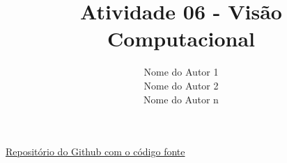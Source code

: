 \documentclass[rascunho,xindy,table]{fei}
\author{
    Nome do Autor 1\\
    Nome do Autor 2\\
    Nome do Autor n\\
}
\title{Atividade 06 - Visão Computacional}
\begin{document}
\maketitle

\href{https://github.com/brunoorlandin/CC7711-VisaoComputacional-.git}{Repositório do Github com o código fonte}


\end{document}
